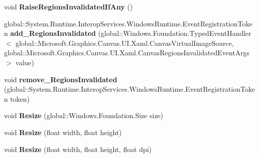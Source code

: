 \begin{DoxyCompactItemize}
void {\bfseries Raise\+Regions\+Invalidated\+If\+Any} ()
\item 
\mbox{\label{class_microsoft_1_1_graphics_1_1_canvas_1_1_u_i_1_1_xaml_1_1_canvas_virtual_image_source_a46f564da4b1f510265fd609033699076}} 
global\+::\+System.\+Runtime.\+Interop\+Services.\+Windows\+Runtime.\+Event\+Registration\+Token {\bfseries add\+\_\+\+Regions\+Invalidated} (global\+::\+Windows.\+Foundation.\+Typed\+Event\+Handler$<$ global\+::\+Microsoft.\+Graphics.\+Canvas.\+U\+I.\+Xaml.\+Canvas\+Virtual\+Image\+Source, global\+::\+Microsoft.\+Graphics.\+Canvas.\+U\+I.\+Xaml.\+Canvas\+Regions\+Invalidated\+Event\+Args $>$ value)
\item 
\mbox{\label{class_microsoft_1_1_graphics_1_1_canvas_1_1_u_i_1_1_xaml_1_1_canvas_virtual_image_source_a137832e2a437516e4b042f34a8da2bde}} 
void {\bfseries remove\+\_\+\+Regions\+Invalidated} (global\+::\+System.\+Runtime.\+Interop\+Services.\+Windows\+Runtime.\+Event\+Registration\+Token token)
\item 
\mbox{\label{class_microsoft_1_1_graphics_1_1_canvas_1_1_u_i_1_1_xaml_1_1_canvas_virtual_image_source_ac6286392a14c2a5995e9eb313e6d1b10}} 
void {\bfseries Resize} (global\+::\+Windows.\+Foundation.\+Size size)
\item 
\mbox{\label{class_microsoft_1_1_graphics_1_1_canvas_1_1_u_i_1_1_xaml_1_1_canvas_virtual_image_source_adc3ef1fa23c6bfa405a644561183b88f}} 
void {\bfseries Resize} (float width, float height)
\item 
\mbox{\label{class_microsoft_1_1_graphics_1_1_canvas_1_1_u_i_1_1_xaml_1_1_canvas_virtual_image_source_aab3cb8ea864e0d0639ab6ad043256e06}} 
void {\bfseries Resize} (float width, float height, float dpi)
\item 
\mbox{\label{class_microsoft_1_1_graphics_1_1_canvas_1_1_u_i_1_1_xaml_1_1_canvas_virtual_image_source_a9d149af6637fa3f4b10f1d6e0950592f}} 

\end{DoxyCompactItemize}
